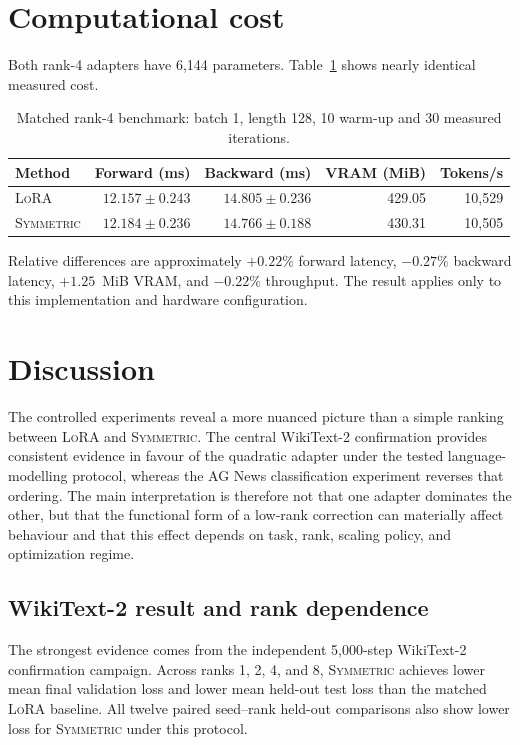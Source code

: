 \documentclass[11pt]{article}
\newcommand{\sym}{\textsc{Symmetric}}\newcommand{\lora}{\textsc{LoRA}}
\begin{document}
\FloatBarrier\section{Computational cost}
Both rank-4 adapters have 6,144 parameters. Table~\ref{tab:cost} shows nearly identical measured cost.
\begin{table}[ht]\centering\caption{Matched rank-4 benchmark: batch 1, length 128, 10 warm-up and 30 measured iterations.}\label{tab:cost}
\begin{tabular}{lrrrr}\toprule Method&Forward (ms)&Backward (ms)&VRAM (MiB)&Tokens/s\\\midrule
\lora{}&$12.157\pm0.243$&$14.805\pm0.236$&429.05&10,529\\\sym{}&$12.184\pm0.236$&$14.766\pm0.188$&430.31&10,505\\\bottomrule\end{tabular}\end{table}
Relative differences are approximately $+0.22\%$ forward latency, $-0.27\%$ backward latency, $+1.25$~MiB VRAM, and $-0.22\%$ throughput. The result applies only to this implementation and hardware configuration.

\section{Discussion}
The controlled experiments reveal a more nuanced picture than a simple ranking between \lora{} and \sym{}. The central WikiText-2 confirmation provides consistent evidence in favour of the quadratic adapter under the tested language-modelling protocol, whereas the AG News classification experiment reverses that ordering. The main interpretation is therefore not that one adapter dominates the other, but that the functional form of a low-rank correction can materially affect behaviour and that this effect depends on task, rank, scaling policy, and optimization regime.

\subsection{WikiText-2 result and rank dependence}
The strongest evidence comes from the independent 5,000-step WikiText-2 confirmation campaign. Across ranks 1, 2, 4, and 8, \sym{} achieves lower mean final validation loss and lower mean held-out test loss than the matched \lora{} baseline. All twelve paired seed--rank held-out comparisons also show lower loss for \sym{} under this protocol.
\end{document}
